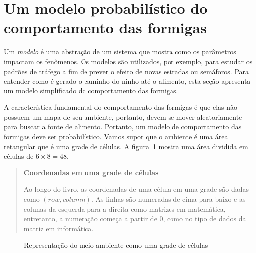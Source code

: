 \section{Um modelo probabilístico do comportamento das formigas}\label{s.ant-probabilistic}

Um \emph{modelo} é uma abstração de um sistema que mostra como os parâmetros impactam os fenômenos. Os modelos são utilizados, por exemplo, para estudar os padrões de tráfego a fim de prever o efeito de novas estradas ou semáforos. Para entender como é gerado o caminho do ninho até o alimento, esta seção apresenta um modelo simplificado do comportamento das formigas. 

A característica fundamental do comportamento das formigas é que elas não possuem um mapa de seu ambiente, portanto, devem se mover aleatoriamente para buscar a fonte de alimento. Portanto, um modelo de comportamento das formigas deve ser probabilístico. Vamos supor que o ambiente é uma área retangular que é uma grade de células. A figura~\ref{fig.ant-grid-empty} mostra uma área dividida em células de $6\times 8=48$.

\begin{quote}
\begin{center}
\textbf{Coordenadas em uma grade de células}
\end{center}
Ao longo do livro, as coordenadas de uma célula em uma grade são dadas como $(\textit{row}, \textit{column})$. As linhas são numeradas de cima para baixo e as colunas da esquerda para a direita como matrizes em matemática, entretanto, a numeração começa a partir de $0$, como no tipo de dados da matriz em informática.
\end{quote}

\begin{figure}
\begin{center}
\end{center}
\caption{Representação do meio ambiente como uma grade de células}\label{fig.ant-grid-empty}
\end{figure}

